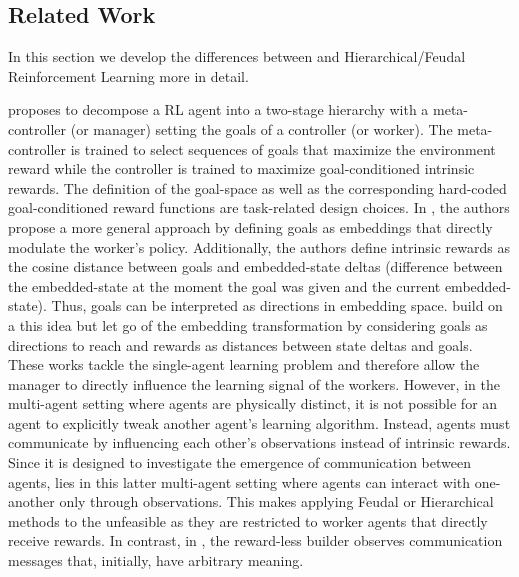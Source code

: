 \newpage

\subsection{Related Work}
\label{ap:sec_related_work}
In this section we develop the differences between \abp and Hierarchical/Feudal Reinforcement Learning more in detail.

\cite{kulkarni2016hierarchical} proposes to decompose a RL agent into a two-stage hierarchy with a meta-controller (or manager) setting the goals of a controller (or worker). The meta-controller is trained to select sequences of goals that maximize the environment reward while the controller is trained to maximize goal-conditioned intrinsic rewards. The definition of the goal-space as well as the corresponding hard-coded goal-conditioned reward functions are task-related design choices. In \cite{vezhnevets2017feudal}, the authors propose a more general approach by defining goals as embeddings that directly modulate the worker's policy. Additionally, the authors define intrinsic rewards as the cosine distance between goals and embedded-state deltas (difference between the embedded-state at the moment the goal was given and the current embedded-state). Thus, goals can be interpreted as directions in embedding space.
\cite{nachum2018data} build on a this idea but let go of the embedding transformation by considering goals as directions to reach and rewards as distances between state deltas and goals. 
These works tackle the single-agent learning problem and therefore allow the manager to directly influence the learning signal of the workers. However, in the multi-agent setting where agents are physically distinct, it is not possible for an agent to explicitly tweak another agent's learning algorithm. Instead, agents must communicate by influencing each other's observations instead of intrinsic rewards. Since it is designed to investigate the emergence of communication between agents, \abp lies in this latter multi-agent setting where agents can interact with one-another only through observations. This makes applying Feudal or Hierarchical methods to the \abp unfeasible as they are restricted to worker agents that directly receive rewards. In contrast, in \abp, the reward-less builder observes communication messages that, initially, have arbitrary meaning.  





